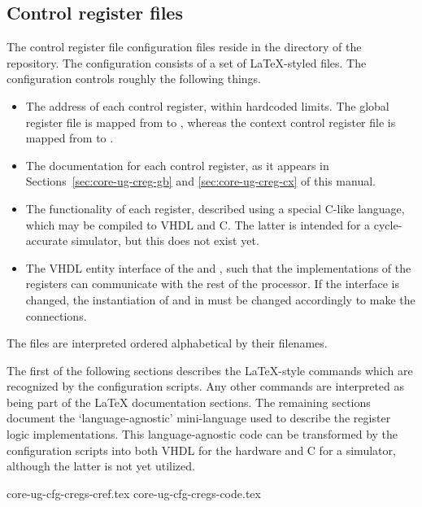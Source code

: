 
\subsection{Control register files}
\label{sec:core-ug-cfg-cregs}

The control register file configuration files reside in the 
directory of the \rvex{} repository. The configuration consists of a set of
LaTeX-styled files. The configuration controls roughly the following things.

\begin{itemize}

\item The address of each control register, within hardcoded limits. The global
      register file is mapped from  to , whereas the
      context control register file is mapped from  to .

\item The documentation for each control register, as it appears in
      Sections~\ref{sec:core-ug-creg-gb} and \ref{sec:core-ug-creg-cx} of this
      manual.
      
\item The functionality of each register, described using a special C-like
      language, which may be compiled to VHDL and C. The latter is intended for
      a cycle-accurate simulator, but this does not exist yet.
      
\item The VHDL entity interface of the  and ,
      such that the implementations of the registers can communicate with the
      rest of the processor. If the interface is changed, the instantiation of
       and  in  must be changed
      accordingly to make the connections.

\end{itemize}

\noindent The files are interpreted ordered alphabetical by their filenames.

The first of the following sections describes the LaTeX-style commands which are
recognized by the configuration scripts. Any other commands are interpreted as
being part of the LaTeX documentation sections. The remaining sections document
the `language-agnostic' mini-language used to describe the register logic
implementations. This language-agnostic code can be transformed by the
configuration scripts into both VHDL for the hardware and C for a simulator,
although the latter is not yet utilized.

{core-ug-cfg-cregs-cref.tex}
{core-ug-cfg-cregs-code.tex}
